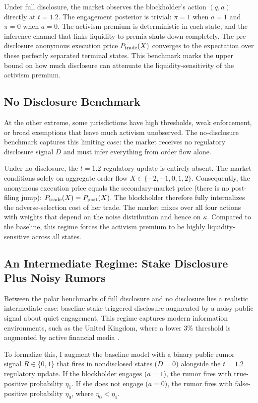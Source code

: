 \documentclass[11pt]{article}
\newcommand{\1}{\mathbf{1}}
\begin{document}
Under full disclosure, the market observes the blockholder's action $(q,a)$ directly at $t=1.2$. The engagement posterior is trivial: $\pi=1$ when $a=1$ and $\pi=0$ when $a=0$. The activism premium is deterministic in each state, and the inference channel that links liquidity to premia shuts down completely. The pre-disclosure anonymous execution price $P_{\textup{trade}}(X)$ converges to the expectation over these perfectly separated terminal states. This benchmark marks the upper bound on how much disclosure can attenuate the liquidity-sensitivity of the activism premium.

%
\subsection{No Disclosure Benchmark}
%

At the other extreme, some jurisdictions have high thresholds, weak enforcement, or broad exemptions that leave much activism unobserved. The no-disclosure benchmark captures this limiting case: the market receives no regulatory disclosure signal $D$ and must infer everything from order flow alone.

Under no disclosure, the $t=1.2$ regulatory update is entirely absent. The market conditions solely on aggregate order flow $X\in\{-2,-1,0,1,2\}$. Consequently, the anonymous execution price equals the secondary-market price (there is no post-filing jump): $P_{\textup{trade}}(X) = P_{\textup{post}}(X)$. The blockholder therefore fully internalizes the adverse-selection cost of her trade. The market mixes over all four actions with weights that depend on the noise distribution and hence on $\kappa$. Compared to the baseline, this regime forces the activism premium to be highly liquidity-sensitive across all states.

%
\subsection{An Intermediate Regime: Stake Disclosure Plus Noisy Rumors}
\label{sec:noisy_rumors}
%

Between the polar benchmarks of full disclosure and no disclosure lies a realistic intermediate case: baseline stake-triggered disclosure augmented by a noisy public signal about quiet engagement. This regime captures modern information environments, such as the United Kingdom, where a lower 3\% threshold is augmented by active financial media \citep{FangPeress2009}.

To formalize this, I augment the baseline model with a binary public rumor signal $R \in \{0,1\}$ that fires in nondisclosed states ($D=0$) alongside the $t=1.2$ regulatory update. If the blockholder engages ($a=1$), the rumor fires with true-positive probability $\eta_1$. If she does not engage ($a=0$), the rumor fires with false-positive probability $\eta_0$, where $\eta_0 < \eta_1$.
\end{document}
